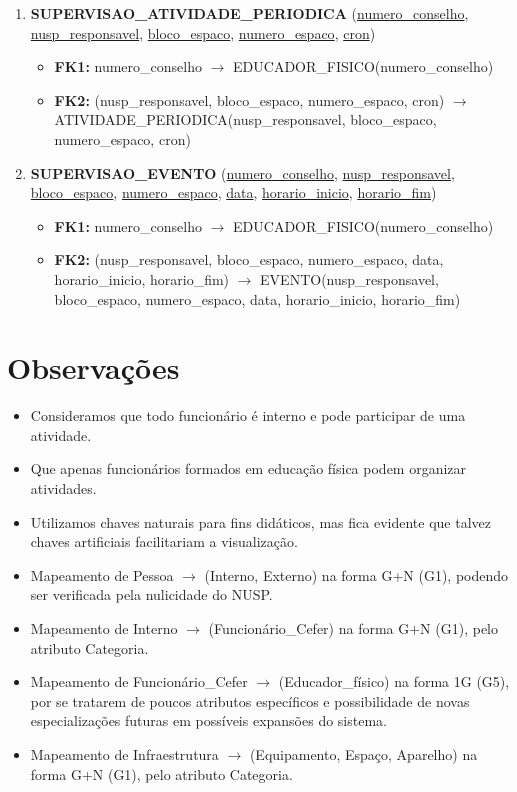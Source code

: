 \documentclass{article}
\begin{document}
\begin{enumerate}
    \item \textbf{SUPERVISAO\_ATIVIDADE\_PERIODICA} (\underline{numero\_conselho}, \underline{nusp\_responsavel}, \underline{bloco\_espaco}, \underline{numero\_espaco}, \underline{cron})
        \begin{itemize}
            \item \textbf{FK1:} numero\_conselho $\rightarrow$ EDUCADOR\_FISICO(numero\_conselho)
            \item \textbf{FK2:} (nusp\_responsavel, bloco\_espaco, numero\_espaco, cron) $\rightarrow$ ATIVIDADE\_PERIODICA(nusp\_responsavel, bloco\_espaco, numero\_espaco, cron)
        \end{itemize}

    \item \textbf{SUPERVISAO\_EVENTO} (\underline{numero\_conselho}, \underline{nusp\_responsavel}, \underline{bloco\_espaco}, \underline{numero\_espaco}, \underline{data}, \underline{horario\_inicio}, \underline{horario\_fim})
        \begin{itemize}
            \item \textbf{FK1:} numero\_conselho $\rightarrow$ EDUCADOR\_FISICO(numero\_conselho)
            \item \textbf{FK2:} (nusp\_responsavel, bloco\_espaco, numero\_espaco, data, horario\_inicio, horario\_fim) $\rightarrow$ EVENTO(nusp\_responsavel, bloco\_espaco, numero\_espaco, data, horario\_inicio, horario\_fim)
        \end{itemize}
\end{enumerate}

\section*{Observações}
\begin{itemize}
    \item Consideramos que todo funcionário é interno e pode participar de uma atividade.
    \item Que apenas funcionários formados em educação física podem organizar atividades.
    \item Utilizamos chaves naturais para fins didáticos, mas fica evidente que talvez chaves artificiais facilitariam a visualização.
    \item Mapeamento de Pessoa $\rightarrow$ (Interno, Externo) na forma G+N (G1), podendo ser verificada pela nulicidade do NUSP.
    \item Mapeamento de Interno $\rightarrow$ (Funcionário\_Cefer) na forma G+N (G1), pelo atributo Categoria.
    \item Mapeamento de Funcionário\_Cefer $\rightarrow$ (Educador\_físico) na forma 1G (G5), por se tratarem de poucos atributos específicos e possibilidade de novas especializações futuras em possíveis expansões do sistema.
    \item Mapeamento de Infraestrutura $\rightarrow$ (Equipamento, Espaço, Aparelho) na forma G+N (G1), pelo atributo Categoria.
\end{itemize}
\end{document}
